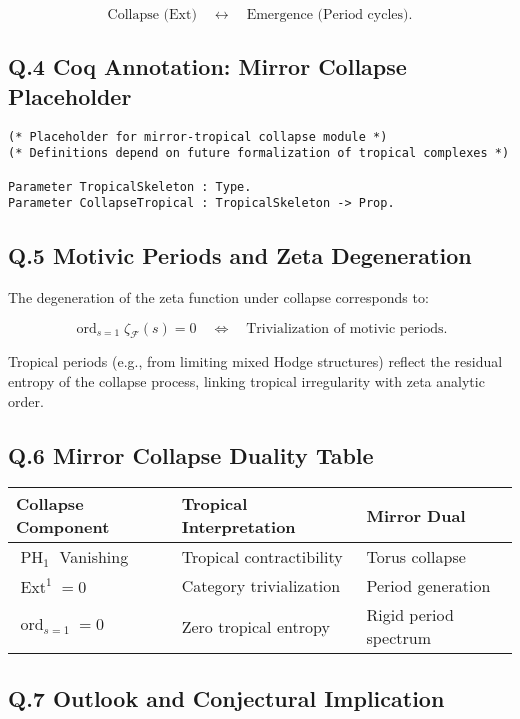 \documentclass[11pt]{article}
\DeclareMathOperator{\Ext}{Ext}
\DeclareMathOperator{\PH}{PH}
\newcommand{\ord}{\operatorname{ord}}
\begin{document}
\[
\text{Collapse (Ext)} \quad \leftrightarrow \quad \text{Emergence (Period cycles)}.
\]

\subsection*{Q.4 Coq Annotation: Mirror Collapse Placeholder}
\begin{lstlisting}[language=Coq]
(* Placeholder for mirror-tropical collapse module *)
(* Definitions depend on future formalization of tropical complexes *)

Parameter TropicalSkeleton : Type.
Parameter CollapseTropical : TropicalSkeleton -> Prop.
\end{lstlisting}

\subsection*{Q.5 Motivic Periods and Zeta Degeneration}

The degeneration of the zeta function under collapse corresponds to:

\[
\ord_{s=1} \zeta_{\mathcal{F}}(s) = 0
\quad \Longleftrightarrow \quad \text{Trivialization of motivic periods}.
\]

Tropical periods (e.g., from limiting mixed Hodge structures) reflect the residual entropy of the collapse process, linking tropical irregularity with zeta analytic order.

\subsection*{Q.6 Mirror Collapse Duality Table}

\begin{center}
\begin{tabular}{|l|l|l|}
\hline
\textbf{Collapse Component} & \textbf{Tropical Interpretation} & \textbf{Mirror Dual} \\
\hline
\(\PH_1\) Vanishing & Tropical contractibility & Torus collapse \\
\(\Ext^1 = 0\) & Category trivialization & Period generation \\
\(\operatorname{ord}_{s=1} = 0\) & Zero tropical entropy & Rigid period spectrum \\
\hline
\end{tabular}
\end{center}


\subsection*{Q.7 Outlook and Conjectural Implication}
\end{document}
